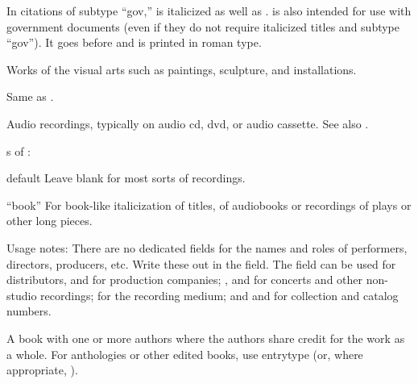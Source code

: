 \documentclass{ltxdockit}[2010/02/12]
\begin{document}
\begin{typelist}
In citations of subtype ``gov,''  is italicized as well as .  is also intended for use with government documents (even if they do not require italicized titles and subtype ``gov''). It goes before  and is printed in roman type.



Works of the visual arts such as paintings, sculpture, and installations.

Same as .




Audio recordings, typically on audio cd, dvd, or audio cassette. See also .

s of :
\begin{valuelist}
\item[default] Leave  blank for most sorts of recordings.
\item[``book''] For book-like italicization of titles, \eg of audiobooks or recordings of plays or other long pieces.
\end{valuelist}



Usage notes: There are no dedicated fields for the names and roles of performers, directors, producers, etc. Write these out in the  field.
The  field can be used for distributors, and  for production companies; ,  and  for concerts and other non-studio recordings;  for the recording medium; and  and  for collection and catalog numbers.





A book with one or more authors where the authors share credit for the work as a whole. For anthologies or other edited books, use entrytype  (or, where appropriate, ). 



\end{typelist}
\end{document}
